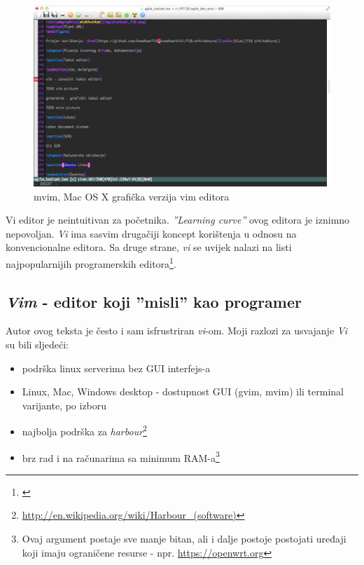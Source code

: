 \documentclass[times, utf8, seminar]{fit}
\begin{document}
\begin{figure}[H]
\centering
\includegraphics[width=14cm]{img/mvim.png}
\caption{mvim, Mac OS X grafička verzija vim editora}
\end{figure}

Vi editor je neintuitivan za početnika. \emph{''Learning curve''} ovog editora je iznimno nepovoljan. \emph{Vi} ima sasvim drugačiji koncept korištenja u odnosu na konvencionalne editora. Sa druge strane, \emph{vi} se uvijek nalazi na listi najpopularnijih programerskih editora\footnote{\href{http://tutorialzine.com/2012/07/battle-of-the-tools-which-is-the-best-code-editor}{\color{blue}{Pregled programerskih editora}}}.

\subsection{\emph{Vim} - editor koji ''misli'' kao programer}

\label{sec:vimaster}

Autor ovog teksta je često i sam isfrustriran \emph{vi}-om. Moji razlozi za usvajanje \emph{Vi} su bili sljedeći:
\begin{itemize}
 \item podrška linux serverima bez GUI interfejs-a
 \item Linux, Mac, Windows desktop - dostupnost GUI (gvim, mvim) ili terminal varijante, po izboru 
 \item najbolja podrška za \emph{harbour}\footnote{\url{http://en.wikipedia.org/wiki/Harbour_(software)}}
 \item brz rad i na računarima sa minimum RAM-a\footnote{Ovaj argument postaje sve manje bitan, ali i dalje postoje postojati uređaji koji imaju ograničene resurse - npr. \url{https://openwrt.org}}
\end{itemize}
\end{document}
